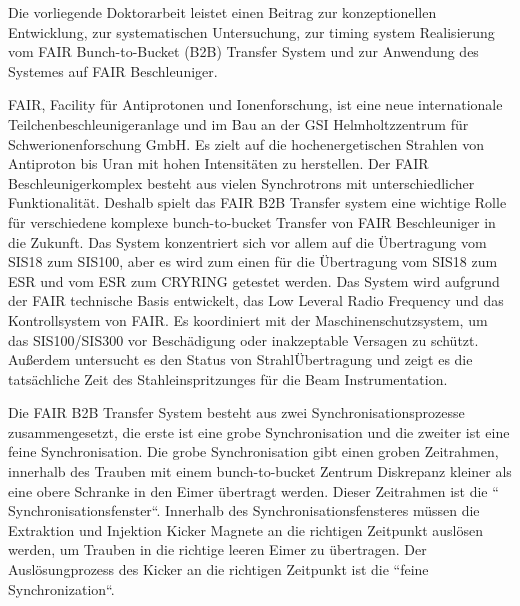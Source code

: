 Die vorliegende Doktorarbeit leistet einen Beitrag zur konzeptionellen Entwicklung, zur systematischen Untersuchung, zur timing system Realisierung vom FAIR Bunch-to-Bucket (B2B) Transfer System und zur Anwendung des Systemes auf FAIR Beschleuniger.

FAIR, Facility für Antiprotonen und Ionenforschung, ist eine neue internationale Teilchenbeschleunigeranlage und im Bau an der GSI Helmholtzzentrum f\"ur Schwerionenforschung GmbH. Es zielt auf die hochenergetischen Strahlen von Antiproton bis Uran mit hohen Intensit\"aten zu herstellen. Der FAIR Beschleunigerkomplex besteht aus vielen Synchrotrons mit unterschiedlicher Funktionalit\"at. Deshalb spielt das FAIR B2B Transfer system eine wichtige Rolle f\"ur verschiedene komplexe bunch-to-bucket Transfer von FAIR Beschleuniger in die Zukunft. Das System konzentriert sich vor allem auf die \"Ubertragung vom SIS18 zum SIS100, aber es wird zum einen für die \"Ubertragung vom SIS18 zum ESR und vom ESR zum CRYRING getestet werden. Das System wird aufgrund der FAIR technische Basis entwickelt, das Low Leveral Radio Frequency und das Kontrollsystem von FAIR. Es koordiniert mit der Maschinenschutzsystem, um das SIS100/SIS300 vor Beschädigung oder inakzeptable Versagen zu schützt. Au\ss erdem untersucht es den Status von Strahl\"Ubertragung und zeigt es die tatsächliche Zeit des Stahleinspritzunges f\"ur die Beam Instrumentation.
 
Die FAIR B2B Transfer System besteht aus zwei Synchronisationsprozesse zusammengesetzt, die erste ist eine grobe Synchronisation und die zweiter ist eine feine Synchronisation. Die grobe Synchronisation gibt einen groben Zeitrahmen, innerhalb des Trauben mit einem  bunch-to-bucket Zentrum Diskrepanz kleiner als eine obere Schranke in den Eimer übertragt werden. Dieser Zeitrahmen ist die `` Synchronisationsfenster``. Innerhalb des Synchronisationsfensteres m\"ussen die Extraktion und Injektion Kicker Magnete an die richtigen Zeitpunkt ausl\"osen werden, um Trauben in die richtige leeren Eimer zu übertragen. Der Auslösungprozess des Kicker an die richtigen Zeitpunkt ist die ``feine Synchronization``.

